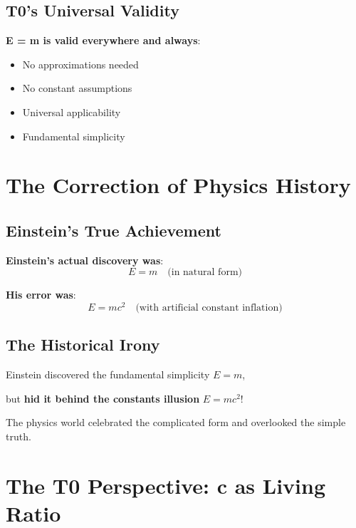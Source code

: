 \documentclass[12pt,a4paper]{article}
\begin{document}
	\subsection{T0's Universal Validity}
	
	\textbf{E = m is valid everywhere and always}:
	\begin{itemize}
		\item No approximations needed
		\item No constant assumptions
		\item Universal applicability
		\item Fundamental simplicity
	\end{itemize}
	
	\section{The Correction of Physics History}
	
	\subsection{Einstein's True Achievement}
	
	\textbf{Einstein's actual discovery was}:
	\begin{equation}
		E = m \quad \text{(in natural form)}
	\end{equation}
	
	\textbf{His error was}:
	\begin{equation}
		E = mc^2 \quad \text{(with artificial constant inflation)}
	\end{equation}
	
	\subsection{The Historical Irony}
	
	\begin{tcolorbox}[colback=blue!5!white,colframe=blue!75!black,title=The Great Irony]
		Einstein discovered the fundamental simplicity $E = m$, 
		
		but \textbf{hid it behind the constants illusion} $E = mc^2$!
		
		The physics world celebrated the complicated form and overlooked the simple truth.
	\end{tcolorbox}
	
	\section{The T0 Perspective: c as Living Ratio}
	
\end{document}
